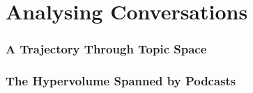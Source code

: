 \chapter{Analysing Conversations}

    \subsection{A Trajectory Through Topic Space}
    \subsection{The Hypervolume Spanned by Podcasts}
